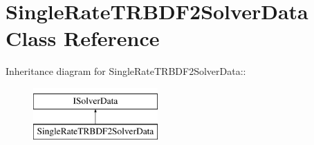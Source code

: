 \hypertarget{classSingleRateTRBDF2SolverData}{
\section{SingleRateTRBDF2SolverData Class Reference}
\label{classSingleRateTRBDF2SolverData}
}
Inheritance diagram for SingleRateTRBDF2SolverData::\begin{figure}[H]
\begin{center}
\leavevmode
\includegraphics[height=2cm]{classSingleRateTRBDF2SolverData}
\end{center}
\end{figure}
